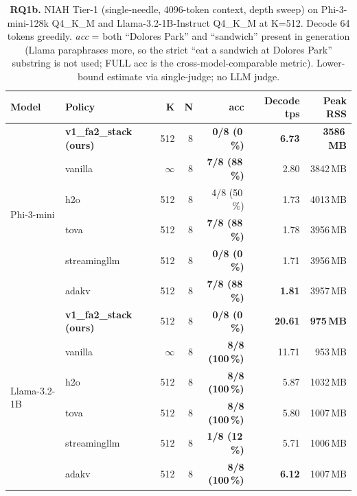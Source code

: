 \documentclass[sigconf, anonymous=false, screen=true]{acmart}
\newcommand{\good}[1]{\textcolor{endurkvgreen}{\textbf{#1}}}
\newcommand{\bad}[1]{\textcolor{endurkvred}{\textbf{#1}}}
\begin{document}
\begin{table}[t]
\caption{\textbf{RQ1b.} NIAH Tier-1 (single-needle, 4096-token context, depth sweep) on Phi-3-mini-128k Q4\_K\_M and Llama-3.2-1B-Instruct Q4\_K\_M at K=512. Decode 64 tokens greedily. \emph{acc} = both ``Dolores Park'' and ``sandwich'' present in generation (Llama paraphrases more, so the strict ``eat a sandwich at Dolores Park'' substring is not used; FULL acc is the cross-model-comparable metric). Lower-bound estimate via single-judge; no LLM judge.}
\label{tab:niah-tier1}
\centering
\small
\begin{tabular}{llrrrrr}
\toprule
\textbf{Model} & \textbf{Policy} & \textbf{K} & \textbf{N} & \textbf{acc} & \textbf{Decode tps} & \textbf{Peak RSS} \\
\midrule
\multirow{6}{*}{Phi-3-mini}     & \textbf{v1\_fa2\_stack (ours)} & 512      & 8 & \bad{0/8 (0\,\%)}  & \good{6.73} & \good{3586\,MB} \\
                                & vanilla                       & $\infty$ & 8 & \good{7/8 (88\,\%)} & 2.80  & 3842\,MB \\
                                & h2o~\cite{zhang2023h2o}        & 512      & 8 & 4/8 (50\,\%)        & 1.73  & 4013\,MB \\
                                & tova~\cite{oren2024tova}       & 512      & 8 & \good{7/8 (88\,\%)} & 1.78  & 3956\,MB \\
                                & streamingllm~\cite{xiao2024streamingllm} & 512 & 8 & \bad{0/8 (0\,\%)}  & 1.71  & 3956\,MB \\
                                & adakv~\cite{feng2025adakv}     & 512      & 8 & \good{7/8 (88\,\%)} & \bad{1.81} & 3957\,MB \\
\midrule
\multirow{6}{*}{Llama-3.2-1B}   & \textbf{v1\_fa2\_stack (ours)} & 512      & 8 & \bad{0/8 (0\,\%)}   & \good{20.61} & \good{975\,MB} \\
                                & vanilla                       & $\infty$ & 8 & \good{8/8 (100\,\%)} & 11.71 & 953\,MB \\
                                & h2o~\cite{zhang2023h2o}        & 512      & 8 & \good{8/8 (100\,\%)} & 5.87  & 1032\,MB \\
                                & tova~\cite{oren2024tova}       & 512      & 8 & \good{8/8 (100\,\%)} & 5.80  & 1007\,MB \\
                                & streamingllm~\cite{xiao2024streamingllm} & 512 & 8 & \bad{1/8 (12\,\%)}  & 5.71  & 1006\,MB \\
                                & adakv~\cite{feng2025adakv}     & 512      & 8 & \good{8/8 (100\,\%)} & \bad{6.12}  & 1007\,MB \\
\bottomrule
\end{tabular}
\end{table}
\end{document}
